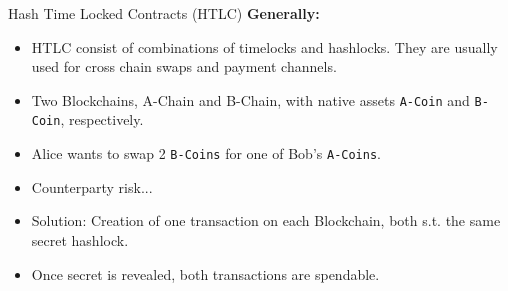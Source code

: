 \documentclass[handout]{beamer}
\begin{document}
\begin{frame}{Hash Time Locked Contracts (HTLC)}
	\textbf{Generally:}
	\begin{itemize}
		\item<1-> HTLC consist of combinations of timelocks and hashlocks. They are usually used for cross chain swaps and payment channels.
	\end{itemize}
	\vspace{0.5cm}
	\begin{itemize}
		\item<2-> Two Blockchains, {A-Chain} and {B-Chain}, with native assets \texttt{A-Coin} and \texttt{B-Coin}, respectively. 
		\item<3-> Alice wants to swap 2 \texttt{B-Coins} for one of Bob's \texttt{A-Coins}.
		\item<4-> Counterparty risk...
		\item<5-> Solution: Creation of one transaction on each Blockchain, both s.t. the same secret hashlock.
		\item<6-> Once secret is revealed, both transactions are spendable.
	\end{itemize}
\end{frame}

\end{document}
